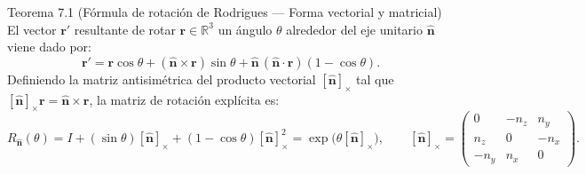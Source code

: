 \documentclass[11pt,letterpaper]{article}
\begin{document}
\begin{theorembox}{Teorema 7.1 (Fórmula de rotación de Rodrigues — Forma vectorial y matricial)}
El vector $\mathbf{r}'$ resultante de rotar $\mathbf{r}\in\mathbb{R}^3$ un ángulo $\theta$ alrededor del eje unitario $\hat{\mathbf{n}}$ viene dado por:
\begin{equation}
  \mathbf{r}' = \mathbf{r}\cos\theta
              + (\hat{\mathbf{n}}\times\mathbf{r})\sin\theta
              + \hat{\mathbf{n}}\,(\hat{\mathbf{n}}\cdot\mathbf{r})(1-\cos\theta).
\end{equation}
Definiendo la matriz antisimétrica del producto vectorial $[\hat{\mathbf{n}}]_\times$ tal que $[\hat{\mathbf{n}}]_\times\mathbf{r} = \hat{\mathbf{n}}\times\mathbf{r}$, la matriz de rotación explícita es:
\begin{equation}
  R_{\hat{\mathbf{n}}}(\theta) = I + (\sin\theta)[\hat{\mathbf{n}}]_\times + (1-\cos\theta)[\hat{\mathbf{n}}]_\times^2 = \exp\bigl(\theta[\hat{\mathbf{n}}]_\times\bigr),
  \qquad
  [\hat{\mathbf{n}}]_\times =
  \begin{pmatrix}
    0 & -n_z & n_y \\
    n_z & 0 & -n_x \\
    -n_y & n_x & 0
  \end{pmatrix}.
\end{equation}
\end{theorembox}
\end{document}
